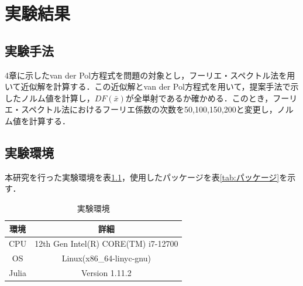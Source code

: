 \documentclass[11pt,a4paper,titlepage]{jsreport}
\theoremstyle{definition}
\newcommand{\vdp}{van der Pol}
\providecommand{\DIFdel}[1]{{\protect\color{red} \scriptsize #1}} %
\providecommand{\DIFaddend}{} %
\providecommand{\DIFdelbegin}{} %
\providecommand{\DIFdelend}{} %
\newcommand{\DIFscaledelfig}{0.5}
\newlength{\DIFdelgraphicswidth} %
\newlength{\DIFdelgraphicsheight} %
\newcommand{\DIFdelincludegraphics}[2][]{%
\sbox{\DIFdelgraphicsbox}{\DIFOincludegraphics[#1]{#2}}%
\settoboxwidth{\DIFdelgraphicswidth}{\DIFdelgraphicsbox} %
\settoboxtotalheight{\DIFdelgraphicsheight}{\DIFdelgraphicsbox} %
\scalebox{\DIFscaledelfig}{%
\parbox[b]{\DIFdelgraphicswidth}{\usebox{\DIFdelgraphicsbox}\\[-\baselineskip] \rule{\DIFdelgraphicswidth}{0em}}\llap{\resizebox{\DIFdelgraphicswidth}{\DIFdelgraphicsheight}{%
\setlength{\unitlength}{\DIFdelgraphicswidth}%
\begin{picture}(1,1)%
\thicklines\linethickness{2pt} %
{\color[rgb]{1,0,0}\put(0,0){\framebox(1,1){}}}%
{\color[rgb]{1,0,0}\put(0,0){\line( 1,1){1}}}%
{\color[rgb]{1,0,0}\put(0,1){\line(1,-1){1}}}%
\end{picture}%
}\hspace*{3pt}}} %
} %
\DeclareRobustCommand{\DIFaddend}{\DIFOaddend \let\includegraphics\DIFOincludegraphics} %
\DeclareRobustCommand{\DIFdelbegin}{\DIFOdelbegin \let\includegraphics\DIFdelincludegraphics} %
\DeclareRobustCommand{\DIFdelend}{\DIFOaddend \let\includegraphics\DIFOincludegraphics} %
\begin{document}

\DIFaddend 



\chapter{実験結果}
\DIFdelbegin \section{\DIFdel{実験手法}}
\addtocounter{section}{-1}%
\DIFdel{4章に示した\vdp{}方程式を問題の対象とし，フーリエ・スペクトル法を用いて近似解を計算する．この近似解と\vdp{}方程式を用いて，提案手法で示したノルム値を計算し，$DF(\bar{x})$が全単射であるか確かめる．このとき，フーリエ・スペクトル法におけるフーリエ係数の次数を50,100,150,200と変更し，ノルム値を計算する．
}%

\DIFdelend \section{実験環境}
本研究を行った実験環境を表\ref{tab:環境}，使用したパッケージを表\ref{tab:パッケージ}を示す．

\begin{table}[h]
  \centering
  \caption{実験環境}
  \label{tab:環境}
  \begin{tabular}{c||c}
    環境 & 詳細 \\ \hline
    CPU & 12th Gen Intel(R) CORE(TM) i7-12700 \\
    OS & Linux(x86_64-linyc-gnu)\\
    Julia & Version 1.11.2
  \end{tabular}
\end{table}
\end{document}
